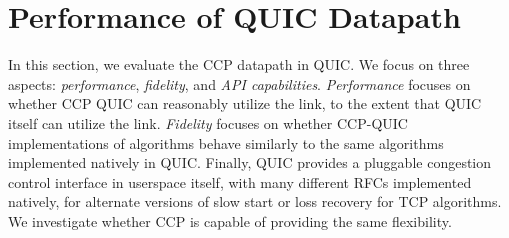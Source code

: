 \chapter{Performance of QUIC Datapath}
\begin{comment}
- We can't *really* look at scalability numbers, so we're going to look at mostly fidelity.
- Why is the performance of the QUIC datapath limited? We observed this happening, and this has been confirmed by many other works online.
- So we're going to focus mainly on fidelity, which is comparing how currently QUIC congestion algorithms behave to how those algorithms behave in CCP:
    We look * mainly * at congestion window evolution at different bandwidths
    We also run multi client scenarios to see how multiple flows would share the link in the QUIC and CCP QUIC case.
    We also look at throughput and delay profiles (brief section and reference how this is made).

    PERFORMANCE METRICS:
        Table of page load times and throughput achieved (or graphs as flows increase) just so we have this.
-Point of this section: Prove that this QUIC datapath is reasonable and good.
-Look at different network conditions as well as how many clients this thing can scale to
-Metrics: congestion window evolution & throughput and delay profiles (relevant for different algorithms)
-Tests: Normal single client connection in various Mahimahi shells -> plus lossy shells as well as cellular shell (very low bandwidth environment)
    -> For some scenarios -- show the cwnd evolution and throughput delay profiles; for other things, show page load time table
-Tests: Multiple client/scalability experiment -> run the server and run multiple clients at once (just run N clients for now to see if it even works)

----- this is without modifications to the algorithm in CCP ----
now, can we get a CCP algorithm to exactly match a QUIC algorithm?
- Try to code this hybrid slow start thing and see if we can exit slow start early like they do.
- And then does it match on ALL links (cellular, lossy, normal) exactly - we can't exactly code this in the CCP API without some tradeoffs

\end{comment}
In this section, we evaluate the CCP datapath in QUIC.
We focus on three aspects: \textit{performance}, \textit{fidelity}, and \textit{API capabilities}.
\textit{Performance} focuses on whether CCP QUIC can reasonably utilize the link, to the extent that QUIC itself can utilize the link.
\textit{Fidelity} focuses on whether CCP-QUIC implementations of algorithms behave similarly to the same algorithms implemented natively in QUIC.
Finally, QUIC provides a pluggable congestion control interface in userspace itself, with many different RFCs implemented natively, for alternate versions of slow start or loss recovery for TCP algorithms.
We investigate whether CCP is capable of providing the same flexibility.

